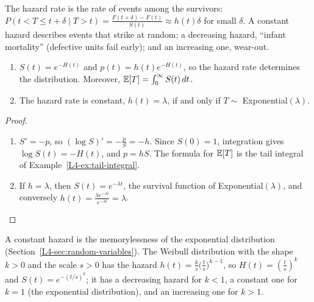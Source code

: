 The hazard rate is the rate of events among the survivors: $P(t < T \leq t + \delta \mid T > t) = \frac{F(t + \delta) - F(t)}{S(t)} \approx h(t)\delta$ for small $\delta$. A constant hazard describes events that strike at random; a decreasing hazard, ``infant mortality'' (defective units fail early); and an increasing one, wear-out.

\begin{proposition}\label{L4-prop:hazard}
    \begin{enumerate}
        \item $S(t) = e^{-H(t)}$ and $p(t) = h(t)e^{-H(t)}$, so the hazard rate determines the distribution. Moreover, $\mathbb{E}[T] = \int_0^\infty S(t)\, dt$.
        \item The hazard rate is constant, $h(t) = \lambda$, if and only if $T \sim$ Exponential$(\lambda)$.
    \end{enumerate}
\end{proposition}

\begin{proof}
    \begin{enumerate}
        \item $S' = -p$, so $(\log S)' = -\frac{p}{S} = -h$. Since $S(0) = 1$, integration gives $\log S(t) = -H(t)$, and $p = hS$. The formula for $\mathbb{E}[T]$ is the tail integral of Example~\ref{L4-ex:tail-integral}.
        \item If $h = \lambda$, then $S(t) = e^{-\lambda t}$, the survival function of Exponential$(\lambda)$, and conversely $h(t) = \frac{\lambda e^{-\lambda t}}{e^{-\lambda t}} = \lambda$. \qedhere
    \end{enumerate}
\end{proof}

A constant hazard is the memorylessness of the exponential distribution (Section~\ref{L4-sec:random-variables}). The Weibull distribution with the shape $k > 0$ and the scale $s > 0$ has the hazard $h(t) = \frac{k}{s}\big(\frac{t}{s}\big)^{k-1}$, so $H(t) = (\frac{t}{s})^k$ and $S(t) = e^{-(t/s)^k}$; it has a decreasing hazard for $k < 1$, a constant one for $k = 1$ (the exponential distribution), and an increasing one for $k > 1$.

